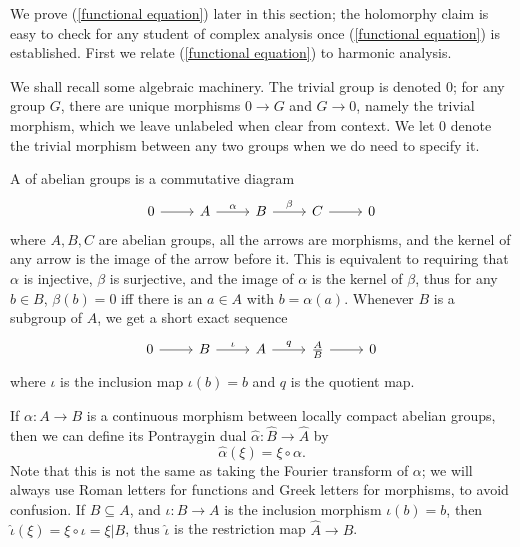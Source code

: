 We prove (\ref{functional equation}) later in this section; the holomorphy claim is easy to check for any student of complex analysis once (\ref{functional equation}) is established.
First we relate (\ref{functional equation}) to harmonic analysis.

We shall recall some algebraic machinery.
The trivial group is denoted $0$; for any group $G$, there are unique morphisms $0 \to G$ and $G \to 0$, namely the trivial morphism, which we leave unlabeled when clear from context.
We let $0$ denote the trivial morphism between any two groups when we do need to specify it.

A  of abelian groups is a commutative diagram
$$\begin{tikzcd}
0 \arrow[r] & A \arrow[r,"\alpha"] & B \arrow[r,"\beta"] & C \arrow[r] & 0
\end{tikzcd}$$
where $A,B,C$ are abelian groups, all the arrows are morphisms, and the kernel of any arrow is the image of the arrow before it.
This is equivalent to requiring that $\alpha$ is injective, $\beta$ is surjective, and the image of $\alpha$ is the kernel of $\beta$, thus for any $b \in B$, $\beta(b) = 0$ iff there is an $a \in A$ with $b = \alpha(a)$.
Whenever $B$ is a subgroup of $A$, we get a short exact sequence
\begin{equation}
\label{quotient SES}
\begin{tikzcd}
0 \arrow[r] & B \arrow[r,"\iota"] & A \arrow[r,"q"] & \frac{A}{B} \arrow[r] & 0
\end{tikzcd}
\end{equation}
where $\iota$ is the inclusion map $\iota(b) =b$ and $q$ is the quotient map.

If $\alpha: A \to B$ is a continuous morphism between locally compact abelian groups, then we can define its Pontraygin dual $\hat \alpha: \hat B \to \hat A$ by
$$\hat \alpha(\xi) = \xi \circ \alpha.$$
Note that this is not the same as taking the Fourier transform of $\alpha$; we will always use Roman letters for functions and Greek letters for morphisms, to avoid confusion.
If $B \subseteq A$, and $\iota: B \to A$ is the inclusion morphism $\iota(b) = b$, then $\hat \iota(\xi) = \xi \circ \iota = \xi|B$, thus $\hat \iota$ is the restriction map $\hat A \to \hat B$.

